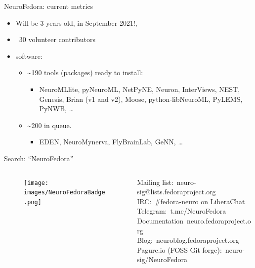 \begin{frame}[c]{NeuroFedora: current metrics}
	\begin{itemize}
		\item \alert{Will be 3 years old, in September 2021!\footnotemark[8],}
		\item \textcolor{FirstGreen}{~30 volunteer contributors}
		\item \textcolor{FriendsMagenta}{software:}
		\begin{itemize}
			\item \textasciitilde{}190 tools (packages) ready to install\footnotemark[9]:
			\begin{itemize}
				\item NeuroMLlite, pyNeuroML, NetPyNE, Neuron, InterViews, NEST, Genesis, Brian (v1 and v2), Moose, python-libNeuroML, PyLEMS, PyNWB, \ldots
			\end{itemize}
			\item \textasciitilde{}200 in queue\footnotemark[10].
			\begin{itemize}
				\item EDEN, NeuroMynerva, FlyBrainLab, GeNN, \ldots
			\end{itemize}
		\end{itemize}
	\end{itemize}
\end{frame}

\begin{frame}[c]{Search: ``NeuroFedora''}
	\begin{columns}
		\begin{column}{0.3\textwidth}
			\begin{figure}[h]
				\centering
				\texttt{[image: images/NeuroFedoraBadge.png]}
			\end{figure}
		\end{column}
		\begin{column}{0.8\textwidth}
			\textcolor{FedoraBlue}{Mailing list:\ neuro-sig@lists.fedoraproject.org}\\
			\textcolor{FirstGreen}{IRC:\ \#fedora-neuro on LiberaChat}\\
			\textcolor{FeaturesOrange}{Telegram:\ t.me/NeuroFedora}\\
			\textcolor{FriendsMagenta}{Documentation\ neuro.fedoraproject.org}\\
			\textcolor{FirstGreen}{Blog:\ neuroblog.fedoraproject.org}\\
			\textcolor{FeaturesOrange}{Pagure.io (FOSS Git forge):\ neuro-sig/NeuroFedora}
		\end{column}
	\end{columns}
\end{frame}


